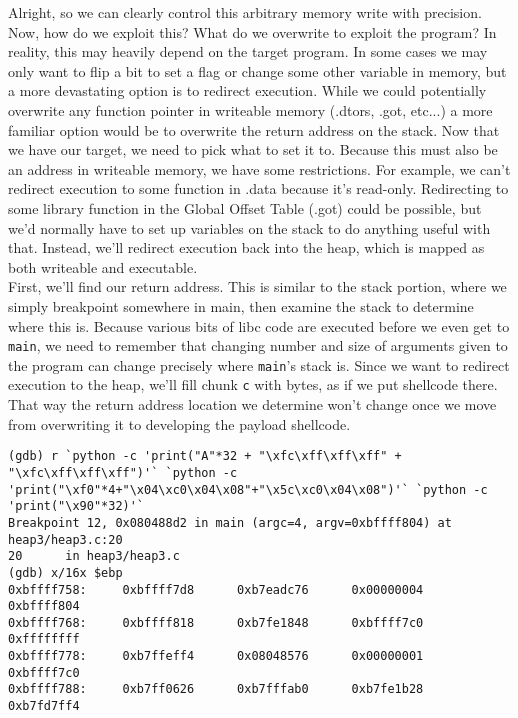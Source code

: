 Alright, so we can clearly control this arbitrary memory write with precision. Now,
how do we exploit this? What do we overwrite to exploit the program? In reality,
this may heavily depend on the target program. In some cases we may only want
to flip a bit to set a flag or change some other variable in memory, but
a more devastating option is to redirect execution. While we could
potentially overwrite any function pointer in writeable memory (.dtors, .got, etc...)
a more familiar option would be to overwrite the return address on the stack.
Now that we have our target, we need to pick what to set it to.
Because this must also be an address in writeable memory, we have some restrictions.
For example, we can't redirect execution to some function in .data because it's
read-only. Redirecting to some library function in the Global Offset Table (.got)
could be possible, but we'd normally have to set up variables on the stack
to do anything useful with that. Instead, we'll redirect execution back
into the heap, which is mapped as both writeable and executable.\\


First, we'll find our return address. This is similar to the stack portion, where
we simply breakpoint somewhere in main, then examine the stack to determine where
this is. Because various bits of libc code are executed before we even get to
\texttt{main}, we need to remember that changing number and size of arguments
given to the program can change precisely where \texttt{main}'s stack is. Since we
want to redirect execution to the heap, we'll fill chunk \texttt{c} with bytes,
as if we put shellcode there. That way the return address location we determine 
won't change once we move from overwriting it to developing the payload shellcode.

\begin{lstlisting}
(gdb) r `python -c 'print("A"*32 + "\xfc\xff\xff\xff" + "\xfc\xff\xff\xff")'` `python -c 'print("\xf0"*4+"\x04\xc0\x04\x08"+"\x5c\xc0\x04\x08")'` `python -c 'print("\x90"*32)'`
Breakpoint 12, 0x080488d2 in main (argc=4, argv=0xbffff804) at heap3/heap3.c:20
20      in heap3/heap3.c
(gdb) x/16x $ebp
0xbffff758:     0xbffff7d8      0xb7eadc76      0x00000004      0xbffff804
0xbffff768:     0xbffff818      0xb7fe1848      0xbffff7c0      0xffffffff
0xbffff778:     0xb7ffeff4      0x08048576      0x00000001      0xbffff7c0
0xbffff788:     0xb7ff0626      0xb7fffab0      0xb7fe1b28      0xb7fd7ff4
\end{lstlisting}

